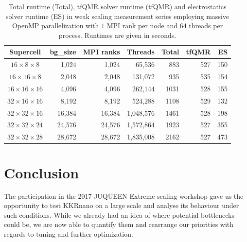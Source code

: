 \begin{table}[h!]
  \caption{Total runtime (Total), tfQMR solver runtime (tfQMR) and electrostatics solver runtime (ES)
  in weak scaling measurement series employing massive OpenMP parallelization with $1$ MPI rank per node
  and $64$ threads per process. Runtimes are given in seconds.}
\begin{center}
\begin{tabular}{|c|r|r|r|r|r|r|}
\hline
 Supercell               & bg\_size  & MPI ranks  &   Threads & Total & tfQMR &  ES \\
\hline\hline
$16 \times  8 \times  8$ &     1,024 &      1,024 &    65,536 &   883 &   527 & 150 \\
$16 \times 16 \times  8$ &     2,048 &      2,048 &   131,072 &   935 &   535 & 154 \\
$16 \times 16 \times 16$ &     4,096 &      4,096 &   262,144 &  1031 &   528 & 155 \\
$32 \times 16 \times 16$ &     8,192 &      8,192 &   524,288 &  1108 &   529 & 132 \\
$32 \times 32 \times 16$ &    16,384 &     16,384 & 1,048,576 &  1461 &   528 & 198 \\
$32 \times 32 \times 24$ &    24,576 &     24,576 & 1,572,864 &  1923 &   527 & 355 \\
$32 \times 32 \times 28$ &    28,672 &     28,672 & 1,835,008 &  2162 &   527 & 473 \\
\hline
\end{tabular}
\end{center}
\label{kkrnano:mnge_weakscaling_massiveomp}
\end{table}





\section*{Conclusion}
The participation in the 2017 JUQUEEN Extreme scaling workshop gave us the opportunity to test KKRnano on a large scale and
analyse its behaviour under such conditions.
While we already had an idea of where potential bottlenecks could be, we are now able
to quantify them and rearrange our priorities with regards to tuning and further optimization.

